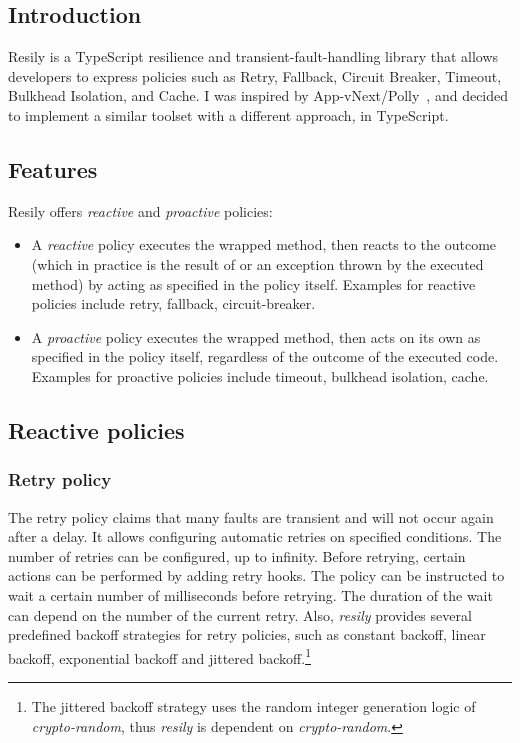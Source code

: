 \subsection{Introduction}

Resily is a TypeScript resilience and transient-fault-handling library that allows developers to express policies such as Retry, Fallback, Circuit Breaker, Timeout, Bulkhead Isolation, and Cache. I was inspired by App-vNext/Polly~\cite{pollygithub}, and decided to implement a similar toolset with a different approach, in TypeScript.

\subsection{Features}

Resily offers \emph{reactive} and \emph{proactive} policies:

\begin{itemize}
\item A \emph{reactive} policy executes the wrapped method, then reacts to the outcome (which in practice is the result of or an exception thrown by the executed method) by acting as specified in the policy itself. Examples for reactive policies include retry, fallback, circuit-breaker.
\item A \emph{proactive} policy executes the wrapped method, then acts on its own as specified in the policy itself, regardless of the outcome of the executed code. Examples for proactive policies include timeout, bulkhead isolation, cache.
\end{itemize}

\subsection{Reactive policies}

\subsubsection{Retry policy}

The retry policy claims that many faults are transient and will not occur again after a delay. It allows configuring automatic retries on specified conditions. The number of retries can be configured, up to infinity. Before retrying, certain actions can be performed by adding retry hooks. The policy can be instructed to wait a certain number of milliseconds before retrying. The duration of the wait can depend on the number of the current retry. Also, \emph{resily} provides several predefined backoff strategies for retry policies, such as constant backoff, linear backoff, exponential backoff and jittered backoff.\footnote{The jittered backoff strategy uses the random integer generation logic of \emph{crypto-random}, thus \emph{resily} is dependent on \emph{crypto-random}.}

